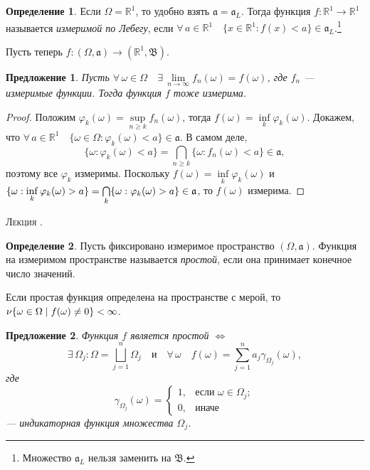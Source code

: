 \documentclass[12pt,titlepage]{article}
\newcounter{lec}
\renewcommand{\thelec}{\arabic{lec}}
\newcommand*{\lecture}{\refstepcounter{lec}\vspace{20pt}
\begin{center}{\rmfamily\textsc{Лекция \thelec.}}
\end{center}}
\newcounter{tema}
\newtheorem{predl}{Предложение}[tema]
\theoremstyle{definition}
\newtheorem{defen}{Определение}[tema]
\newcommand*{\p}[1]{#1\nobreak\discretionary{}{\hbox{$\mathsurround=0pt #1$}}{}}
\begin{document}
\begin{defen}
Если $\Omega=\mathbb{R}^1$, то удобно взять
$\mathfrak{a}=\mathfrak{a}_L$. Тогда функция $f\colon
\mathbb{R}^1\to\mathbb{R}^1$ называется \emph{измеримой по Лебегу},
если $\forall\, a\in\mathbb{R}^1\quad
\{x\in\mathbb{R}^1:f(x)<a\}\in\mathfrak{a}_L$.\footnote{Множество
$\mathfrak{a}_L$ нельзя заменить на $\mathfrak{B}$.}
\end{defen}

Пусть теперь $f\colon
(\Omega,\mathfrak{a})\to(\mathbb{R}^1,\mathfrak{B})$.

\begin{predl}
Пусть $\forall\, \omega\in\Omega\quad\exists\,
\lim\limits_{n\to\infty}f_n(\omega)=f(\omega)$, где $f_n$ ---
измеримые функции. Тогда функция $f$ тоже измерима.
\end{predl}

\begin{proof}
Положим $\varphi_k(\omega)=\sup\limits_{n\geqslant k}f_n(\omega)$,
тогда $f(\omega)=\inf\limits_k\varphi_k(\omega)$. Докажем, что
$\forall\, a\in\mathbb{R}^1\quad
\{\omega\in\Omega:\varphi_k(\omega)<a\}\in\mathfrak{a}$. В самом
деле, $$\{\omega:\varphi_k(\omega)<a\}=\bigcap\limits_{n\geqslant
k}\{\omega:f_n(\omega)<a\}\in\mathfrak{a},$$ поэтому все $\varphi_k$
измеримы. Поскольку $f(\omega)=\inf\limits_k \varphi_k(\omega)$ и
$\{\omega: \inf\limits_k
\varphi_k(\omega)\p>a\}=\bigcap\limits_k\{\omega:\varphi_k(\omega)\p
>a\}\in\mathfrak{a}$, то $f(\omega)$ измерима.
\end{proof}

\lecture

\begin{defen}
Пусть фиксировано измеримое пространство $(\Omega,\mathfrak{a})$.
Функция на измеримом пространстве называется \emph{простой}, если
она принимает конечное число значений.

Если простая функция определена на пространстве с мерой, то
$\nu\{\omega\p\in\Omega\mid f(\omega)\neq 0\}<\infty$.
\end{defen}

\begin{predl}
Функция $f$ является простой $\Leftrightarrow$ $$\exists\,\Omega_j:
\Omega=\bigsqcup\limits_{j=1}^n \Omega_j \quad\text{и}\quad
\forall\,\omega \quad f(\omega)=\sum\limits_{j=1}^n
a_j\gamma_{\Omega_j}(\omega),$$ где
$$\gamma_{\Omega_j}(\omega)=\begin{cases}1,&\text{если $\omega\in\Omega_j$};\\ 0,&\text{иначе}
\end{cases}$$ --- \emph{индикаторная функция множества} $\Omega_j$.
\end{predl}
\end{document}
